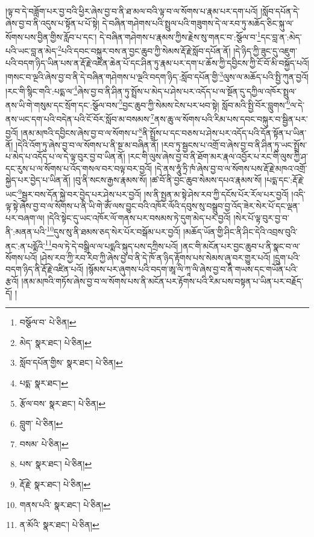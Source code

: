 །ལྟ་བ་དེ་བཟློག་པར་བྱ་བའི་ཕྱིར་ཞེས་བྱ་བ་ནི་ཐ་མལ་བའི་ལྟ་བ་ལ་སོགས་པ་རྣམ་པར་དག་པའོ། །སློབ་དཔོན་དེ་ཞེས་བྱ་བ་ནི་འདུས་པ་སྟོན་པ་པོ་སྟེ། དེ་བཞིན་གཤེགས་པའི་སྤྲུལ་པའི་གཟུགས་དེ་ལ་རབ་ཏུ་མཆོད་ཅིང་སྐུ་ལ་སོགས་པས་བྱིན་གྱིས་རློབ་པ་དང་། དེ་བཞིན་གཤེགས་པ་རྣམས་ཀྱིས་རྗེས་སུ་གནང་བ་:སྩོལ་བ་\footnote{བསྩོལ་བ་  པེ་ཅིན། }དང་བླ་ན་:མེད་པའི་ཡང་བླ་ན་མེད་\footnote{མེད་  སྣར་ཐང་།  པེ་ཅིན། }པའི་དབང་བསྐུར་བས་ན་བྱང་ཆུབ་ཀྱི་སེམས་རྡོ་རྗེ་སློབ་དཔོན་ནོ། །དེ་ཉིད་ཀྱི་ཟུང་དུ་འཇུག་པའི་བདག་ཉིད་ཡིན་པས་ན་རྡོ་རྗེ་འཛིན་ཆེན་པོ་དང་ཤིན་ཏུ་རྣམ་པར་དག་པ་ཆོས་ཀྱི་དབྱིངས་ཀྱི་ངོ་བོ་མི་བསྐྱོད་པའོ། །གསང་བ་ལྔའི་ཞེས་བྱ་བ་ནི་དེ་བཞིན་གཤེགས་པ་ལྔའི་བདག་ཉིད་:སློབ་དཔོན་གྱི་\footnote{སློབ་དཔོན་གྱིས་  སྣར་ཐང་།  པེ་ཅིན། }ལུས་ལ་མཆོད་པའི་སྤྱི་ཀུན་བྱའོ། །རང་གི་སྙིང་གའི་:པདྨ་ལ་\footnote{པདྨ་  སྣར་ཐང་། }ཞེས་བྱ་བ་ནི་ཤིན་ཏུ་སྤྲོས་པ་མེད་པ་ཤེས་པར་འདོད་པ་ལ་སྔོན་དུ་དཀྱིལ་འཁོར་སྤྲུལ་ནས་ཡི་གེ་གསུམ་དང་སྲོག་དང་:སྩོལ་བས་\footnote{རྩོལ་བས་  སྣར་ཐང་།  པེ་ཅིན། }བྱང་ཆུབ་ཀྱི་སེམས་ངེས་པར་ཕབ་སྟེ། སློབ་མའི་སྤྱི་བོར་བླུགས་\footnote{བླུག་  པེ་ཅིན། }ལ་དེ་ནས་ཡང་དག་པའི་བདེན་པའི་ངོ་བོར་སློབ་མ་བསམས་\footnote{བསམ་  པེ་ཅིན། }ནས་ཆུ་ལ་སོགས་པའི་རིམ་པས་དབང་བསྐུར་བ་སྦྱིན་པར་བྱའོ། །ནམ་མཁའི་དབྱིངས་ཞེས་བྱ་བ་ལ་སོགས་པ་\footnote{པས་  སྣར་ཐང་།  པེ་ཅིན། }ནི་སྤྲོས་པ་དང་བཅས་པ་ཤེས་པར་འདོད་པའི་དོན་སྟོན་པ་ཡིན་ནོ། །དེའི་འོག་ཏུ་ཞེས་བྱ་བ་ལ་སོགས་པ་ནི་སྔ་མ་བཞིན་ནོ། །རབ་ཏུ་སྦྱངས་པ་འགྲོ་བ་ཞེས་བྱ་བ་ནི་ཤིན་ཏུ་ཡང་སྤྲོས་པ་མེད་པ་འདོད་པ་ལ་དེ་ལྟ་བུར་བྱ་བ་ཡིན་ནོ། །རང་གི་ལུས་ཞེས་བྱ་བ་ནི་ཐོག་མར་རྣལ་འབྱོར་པ་རང་གི་ལུས་ཀྱི་ཤ་དང་རུས་པ་ལ་སོགས་པ་འོད་གསལ་བར་བལྟ་བར་བྱའོ། །དེ་ནས་ཧཱུཾ་ཏྲི་ཁཾ་ཞེས་བྱ་བ་ལ་སོགས་པས་རྡོ་རྗེ་མཁའ་འགྲོ་སྐྱེད་པར་བྱེད་པ་ཡིན་ནོ། །བུ་ནི་སངས་རྒྱས་རྣམས་སོ། །ཚ་བོ་ནི་བྱང་ཆུབ་སེམས་དཔའ་རྣམས་སོ། །པདྨ་དང་:རྡོ་རྗེ་ཡང་\footnote{རྡོ་རྗེ་  སྣར་ཐང་།  པེ་ཅིན། }སྦྱར་བས་དོན་སྐྱེ་བར་བྱེད་པར་ཤེས་པར་བྱའོ། །ས་ནི་སྤྱན་མ་སྟེ་ཤེས་རབ་ཀྱི་དངོས་པོར་རོལ་པར་བྱའོ། །འདི་ལྟ་སྟེ་ཞེས་བྱ་བ་ལ་སོགས་པ་ནི་ཡི་གེ་ཨོཾ་ལས་བྱུང་བའི་འཁོར་ལོའི་དབུས་སུ་བསྒྲུབ་བྱ་འོད་ཟེར་སེར་པོ་དང་ལྡན་པར་བཞག་ལ། །དེའི་སྟེང་དུ་ཡང་འཁོར་ལོ་གནས་པར་བསམས་ཏེ་དུག་མེད་པར་བྱའོ། །སེར་པོ་ལྟ་བུར་བྱ་བ་ནི་:མནན་པའི་\footnote{གནས་པའི་  སྣར་ཐང་།  པེ་ཅིན། }དུས་སུ་ནི་ཐམས་ཅད་སེར་པོར་བསྒོམ་པར་བྱའོ། །མཆོད་ཡོན་གྱི་ཤིང་ནི་ཤིང་དེའི་འབྲས་བུའི་ནང་:ན་པདྨོའི་\footnote{ན་མོའི་  སྣར་ཐང་།  པེ་ཅིན། }བལ་ཏེ་དེ་བསྒྲིལ་ལ་པདྨའི་སྐུད་པས་དཀྲིས་པའོ། །ནང་གི་མངོན་པར་བྱང་ཆུབ་པ་ནི་སྣང་བ་ལ་སོགས་པའོ། །ཤེས་རབ་ཀྱི་རབ་རིབ་ཀྱི་ཞེས་བྱ་བ་ནི་དེ་ཁོ་ན་ཉིད་རྟོགས་པས་སེམས་ཞུ་བར་གྱུར་པའོ། །དྲུག་པའི་བདག་ཉིད་ནི་རྡོ་རྗེ་འཛིན་པའོ། །སྙོམས་པར་ཞུགས་པའི་བདག་ཨཱ་ལི་ཀཱ་ལི་ཞེས་བྱ་བ་ནི་གཡས་དང་གཡོན་པའི་རྩའོ། །ནམ་མཁའི་གཏོས་ཞེས་བྱ་བ་ལ་སོགས་པས་ནི་མངོན་པར་རྟོགས་པའི་རིམ་པས་བསྟན་པ་ཡིན་པར་བརྗོད་དོ། །
